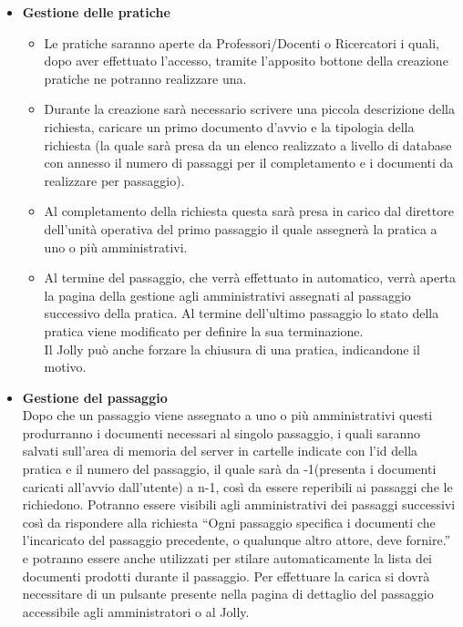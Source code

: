 \documentclass{article}
\begin{document}
\begin{itemize}
    \item \textbf{Gestione delle pratiche}
    \begin{itemize}
        \item Le pratiche saranno aperte da Professori/Docenti o Ricercatori i quali, dopo aver effettuato l'accesso, tramite l'apposito bottone della creazione pratiche ne potranno realizzare una.
        \item Durante la creazione sarà necessario scrivere una piccola descrizione della richiesta, caricare un primo documento d'avvio e la tipologia della richiesta (la quale sarà presa da un elenco realizzato a livello di database con annesso il numero di passaggi per il completamento e i documenti da realizzare per passaggio).
        \item  Al completamento della richiesta questa sarà presa in carico dal direttore dell'unità operativa del primo passaggio il quale assegnerà la pratica a uno o più amministrativi.
        \item Al termine del passaggio, che verrà effettuato in automatico, verrà aperta la pagina della gestione agli amministrativi assegnati al passaggio successivo della pratica. Al termine dell'ultimo passaggio lo stato della pratica viene modificato per definire la sua terminazione.\\
        Il Jolly può anche forzare la chiusura di una pratica, indicandone il motivo.
    \end{itemize}

    \item \textbf{Gestione del passaggio}\\
    
Dopo che un passaggio viene assegnato a uno o più amministrativi questi produrranno i documenti necessari al singolo passaggio, i quali saranno salvati sull'area di memoria del server in cartelle indicate con l'id della pratica e il numero del passaggio, il quale sarà da -1(presenta i documenti caricati all'avvio dall'utente) a n-1, così da essere reperibili ai passaggi che le richiedono. Potranno essere visibili agli amministrativi dei passaggi successivi così da rispondere alla richiesta “Ogni passaggio specifica i documenti che l'incaricato del passaggio precedente, o qualunque altro attore, deve fornire.” e potranno essere anche utilizzati per stilare automaticamente la lista dei documenti prodotti durante il passaggio.
Per effettuare la carica si dovrà necessitare di un pulsante presente nella pagina di dettaglio del passaggio accessibile agli amministratori o al Jolly.


\end{itemize}
\end{document}
